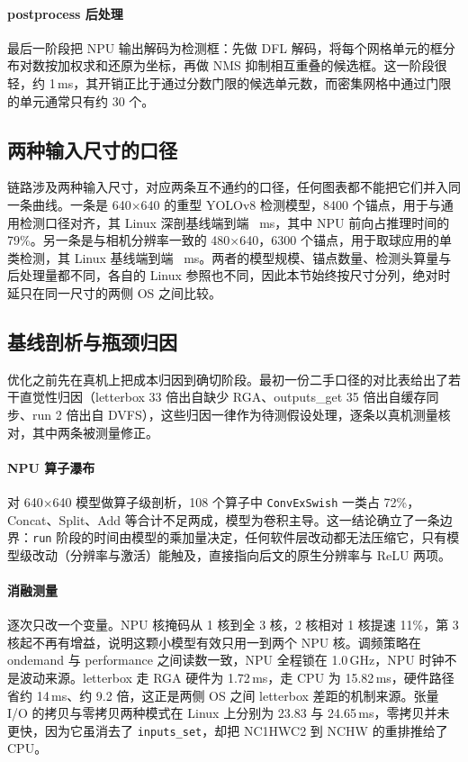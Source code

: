 \paragraph{postprocess 后处理}
最后一阶段把 NPU 输出解码为检测框：先做 DFL 解码，将每个网格单元的框分布对数按加权求和还原为坐标，再做 NMS 抑制相互重叠的候选框。这一阶段很轻，约 1\,ms，其开销正比于通过分数门限的候选单元数，而密集网格中通过门限的单元通常只有约 30 个。

\subsection{两种输入尺寸的口径}

链路涉及两种输入尺寸，对应两条互不通约的口径，任何图表都不能把它们并入同一条曲线。一条是 640×640 的重型 YOLOv8 检测模型，8400 个锚点，用于与通用检测口径对齐，其 Linux 深剖基线端到端 \nEteBigLin~ms，其中 NPU 前向占推理时间的 79\%。另一条是与相机分辨率一致的 480×640，6300 个锚点，用于取球应用的单类检测，其 Linux 基线端到端 \nInferTennisLin~ms。两者的模型规模、锚点数量、检测头算量与后处理量都不同，各自的 Linux 参照也不同，因此本节始终按尺寸分列，绝对时延只在同一尺寸的两侧 OS 之间比较。

\subsection{基线剖析与瓶颈归因}

优化之前先在真机上把成本归因到确切阶段。最初一份二手口径的对比表给出了若干直觉性归因（letterbox 33 倍出自缺少 RGA、outputs\_get 35 倍出自缓存同步、run 2 倍出自 DVFS），这些归因一律作为待测假设处理，逐条以真机测量核对，其中两条被测量修正。

\paragraph{NPU 算子瀑布}
对 640×640 模型做算子级剖析，108 个算子中 \texttt{ConvExSwish} 一类占 72\%，Concat、Split、Add 等合计不足两成，模型为卷积主导。这一结论确立了一条边界：\texttt{run} 阶段的时间由模型的乘加量决定，任何软件层改动都无法压缩它，只有模型级改动（分辨率与激活）能触及，直接指向后文的原生分辨率与 ReLU 两项。

\paragraph{消融测量}
逐次只改一个变量。NPU 核掩码从 1 核到全 3 核，2 核相对 1 核提速 11\%，第 3 核起不再有增益，说明这颗小模型有效只用一到两个 NPU 核。调频策略在 ondemand 与 performance 之间读数一致，NPU 全程锁在 1.0\,GHz，NPU 时钟不是波动来源。letterbox 走 RGA 硬件为 1.72\,ms，走 CPU 为 15.82\,ms，硬件路径省约 14\,ms、约 9.2 倍，这正是两侧 OS 之间 letterbox 差距的机制来源。张量 I/O 的拷贝与零拷贝两种模式在 Linux 上分别为 23.83 与 24.65\,ms，零拷贝并未更快，因为它虽消去了 \texttt{inputs\_set}，却把 NC1HWC2 到 NCHW 的重排推给了 CPU。

